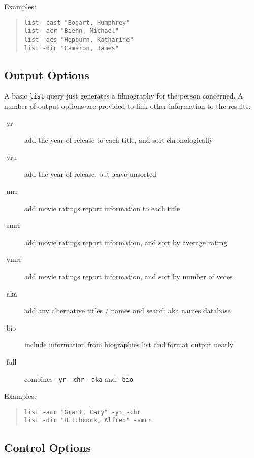 Examples:
\begin{quote}
{\tt list -cast "Bogart, Humphrey"}\\
{\tt list -acr "Biehn, Michael"}\\
{\tt list -acs "Hepburn, Katharine"}\\
{\tt list -dir "Cameron, James"}
\end{quote}

\subsection{Output Options}

A basic {\tt list} query just generates a filmography for the person 
concerned. 
A number of output options are provided to link other information to the 
results:
\begin{description}
\item[-yr]    add the year of release to each title, and sort 
chronologically
\item[-yru]   add the year of release, but leave unsorted
\item[-mrr]   add movie ratings report information to each title
\item[-smrr]  add movie ratings report information, and sort by average 
rating
\item[-vmrr]  add movie ratings report information, and sort by number of 
votes
\item[-aka]   add any alternative titles / names and search aka names 
database
\item[-bio]   include information from biographies list and format output 
neatly
\item[-full]  combines {\tt -yr -chr -aka} and {\tt -bio}
\end{description}

Examples:
\begin{quote}
{\tt list -acr "Grant, Cary" -yr -chr}\\
{\tt list -dir "Hitchcock, Alfred" -smrr}
\end{quote}

\subsection{Control Options}


